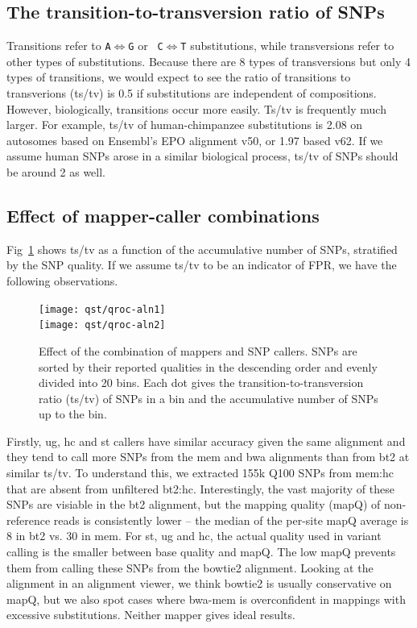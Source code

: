 \documentclass{bioinfo}
\newcommand{\textssf}[1]{\textsf{\footnotesize #1}}
\begin{document}
\subsection{The transition-to-transversion ratio of SNPs}
Transitions refer to {\tt A}$\Leftrightarrow${\tt G} or {\tt
C}$\Leftrightarrow${\tt T} substitutions, while transversions refer to other
types of substitutions. Because there are 8 types of transversions but only 4
types of transitions, we would expect to see the ratio of transitions to
transverions (ts/tv) is 0.5 if substitutions are independent of compositions.
However, biologically, transitions occur more easily. Ts/tv is frequently much
larger. For example, ts/tv of human-chimpanzee substitutions is 2.08 on
autosomes based on Ensembl's EPO alignment v50, or 1.97 based v62. If we assume
human SNPs arose in a similar biological process, ts/tv of SNPs should be
around 2 as well.

\subsection{Effect of mapper-caller combinations}

Fig~\ref{fig:qroc1} shows ts/tv as a function of the accumulative number of
SNPs, stratified by the SNP quality. If we assume ts/tv to be an indicator of
FPR, we have the following observations.

\begin{figure}[!hp]
\centering\texttt{[image: qst/qroc-aln1]}\\
\centering\texttt{[image: qst/qroc-aln2]}
\caption{Effect of the combination of mappers and SNP callers. SNPs are sorted
by their reported qualities in the descending order and evenly divided into 20
bins. Each dot gives the transition-to-transversion ratio (ts/tv) of SNPs in a
bin and the accumulative number of SNPs up to the bin.}\label{fig:qroc1} \end{figure}

Firstly, \textssf{ug}, \textssf{hc} and \textssf{st} callers have similar
accuracy given the same alignment and they tend to call more SNPs from the
\textssf{mem} and \textssf{bwa} alignments than from \textssf{bt2} at similar
ts/tv. To understand this, we extracted 155k Q100 SNPs from \textssf{mem:hc}
that are absent from unfiltered \textssf{bt2:hc}. Interestingly, the vast
majority of these SNPs are visiable in the \textssf{bt2} alignment, but the
mapping quality (mapQ) of non-reference reads is consistently lower -- the
median of the per-site mapQ average is 8 in \textssf{bt2} vs. 30 in \textssf{mem}.
For \textssf{st}, \textssf{ug} and \textssf{hc}, the actual quality used in
variant calling is the smaller between base quality and mapQ. The low mapQ
prevents them from calling these SNPs from the \textssf{bowtie2} alignment.
Looking at the alignment in an alignment viewer, we think \textssf{bowtie2} is
usually conservative on mapQ, but we also spot cases where bwa-mem is
overconfident in mappings with excessive substitutions. Neither mapper gives
ideal results.
\end{document}
